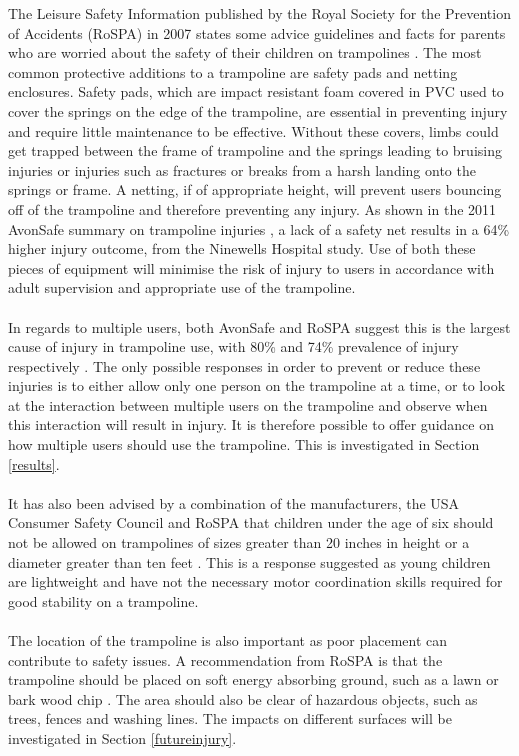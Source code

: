 \noindent The Leisure Safety Information published by the Royal Society for the Prevention of Accidents (RoSPA) in 2007 states some advice guidelines and facts for parents who are worried about the safety of their children on trampolines \cite{rospa}. The most common protective additions to a trampoline are safety pads and netting enclosures. Safety pads, which are impact resistant foam covered in PVC  used to cover the springs on the edge of the trampoline, are essential in preventing injury and require little maintenance to be effective. Without these covers, limbs could get trapped between the frame of trampoline and the springs leading to bruising injuries or injuries such as fractures or breaks from a harsh landing onto the springs or frame. A netting, if of appropriate height, will prevent users bouncing off of the trampoline and therefore preventing any injury. As shown in the 2011 AvonSafe summary on trampoline injuries \cite{actionforsafety}, a lack of a safety net results in a 64\% higher injury outcome, from the Ninewells Hospital study.  Use of both these pieces of equipment will minimise the risk of injury to users in accordance with adult supervision and appropriate use of the trampoline. 
\\
\\
\noindent In regards to multiple users, both AvonSafe and RoSPA suggest this is the largest cause of injury in trampoline use, with 80\% and 74\% prevalence of injury respectively \cite{actionforsafety}. The only possible responses in order to prevent or reduce these injuries is to either allow only one person on the trampoline at a time, or to look at the interaction between multiple users on the trampoline and observe when this interaction will result in injury. It is therefore possible to  offer guidance on how multiple users should use the trampoline. This is investigated in Section \ref{results}.
\\
\\
\noindent It has also been advised by a combination of the manufacturers, the USA Consumer Safety Council and RoSPA that children under the age of six should not be allowed on trampolines of sizes greater than 20 inches in height or a diameter greater than ten feet \cite{rospa}. This is a response suggested as young children are lightweight and have not the necessary motor coordination skills required for good stability on a trampoline.
\\
\\
The location of the trampoline is also important as poor placement can contribute to safety issues. A recommendation from RoSPA is that the trampoline should be placed on soft energy absorbing ground, such as a lawn or bark wood chip \cite{rospa}. The area should also be clear of hazardous objects, such as trees, fences and washing lines. The impacts on different surfaces will be investigated in Section \ref{futureinjury}.


